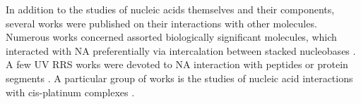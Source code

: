 In addition to the studies of nucleic acids themselves and their components,
several works were published on their interactions with other molecules.
Numerous works concerned assorted biologically significant molecules, which
interacted with NA preferentially via intercalation between stacked
nucleobases \parencite{Chinsky1978}.
A few UV RRS works were devoted to NA interaction with peptides or protein
segments \parencite{Laigle1982a}.
A particular group of works is the studies of nucleic acid interactions with
cis-platinum complexes
\parencite{Perno1987}.
